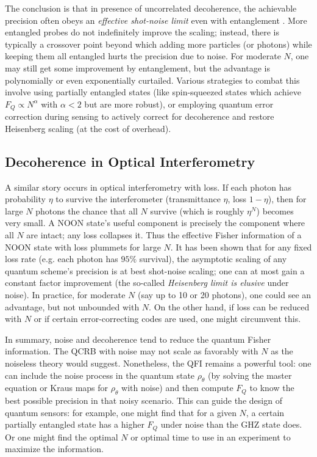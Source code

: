 The conclusion is that in presence of uncorrelated decoherence, the
achievable precision often obeys an \textit{effective shot-noise
  limit} even with entanglement \cite{Demkowicz2012}. More entangled
probes do not indefinitely improve the scaling; instead, there is
typically a crossover point beyond which adding more particles (or
photons) while keeping them all entangled hurts the precision due to
noise. For moderate $N$, one may still get some improvement by
entanglement, but the advantage is polynomially or even exponentially
curtailed. Various strategies to combat this involve using partially
entangled states (like spin-squeezed states which achieve $F_Q \propto
N^{\alpha}$ with $\alpha<2$ but are more robust), or employing quantum
error correction during sensing \cite{Dur2014} to actively correct for
decoherence and restore Heisenberg scaling (at the cost of overhead).



\subsection{Decoherence in Optical Interferometry}



A similar story occurs in optical interferometry with loss. If each
photon has probability $\eta$ to survive the interferometer
(transmittance $\eta$, loss $1-\eta$), then for large $N$ photons the
chance that all $N$ survive (which is roughly $\eta^N$) becomes very
small. A NOON state’s useful component is precisely the component
where all $N$ are intact; any loss collapses it. Thus the effective
Fisher information of a NOON state with loss plummets for large
$N$. It has been shown \cite{Demkowicz2012} that for any fixed loss
rate (e.g. each photon has $95\%$ survival), the asymptotic scaling of
any quantum scheme’s precision is at best shot-noise scaling; one can
at most gain a constant factor improvement (the so-called
\emph{Heisenberg limit is elusive} under noise). In practice, for
moderate $N$ (say up to 10 or 20 photons), one could see an advantage,
but not unbounded with $N$. On the other hand, if loss can be reduced
with $N$ or if certain error-correcting codes are used, one might
circumvent this.



In summary, noise and decoherence tend to reduce the quantum Fisher
information. The QCRB with noise may not scale as favorably with $N$
as the noiseless theory would suggest. Nonetheless, the QFI remains a
powerful tool: one can include the noise process in the quantum state
$\rho_\theta$ (by solving the master equation or Kraus maps for
$\rho_\theta$ with noise) and then compute $F_Q$ to know the best
possible precision in that noisy scenario. This can guide the design
of quantum sensors: for example, one might find that for a given $N$,
a certain partially entangled state has a higher $F_Q$ under noise
than the GHZ state does. Or one might find the optimal $N$ or optimal
time to use in an experiment to maximize the information.



